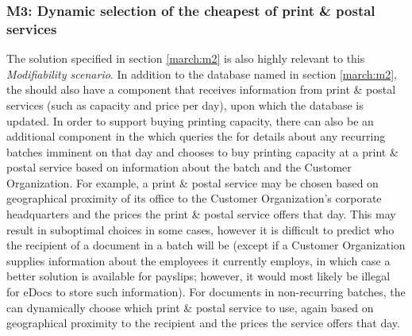 \subsubsection{M3: Dynamic selection of the cheapest of print \& postal services}\label{march:m3}
The solution specified in section \ref{march:m2} is also highly relevant to this \emph{Modifiability scenario}. In addition to the database named in section \ref{march:m2}, the  should also have a component that receives information from print \& postal services (such as capacity and price per day), upon which the database is updated. In order to support buying printing capacity, there can also be an additional component in the  which queries the  for details about any recurring batches imminent on that day and chooses to buy printing capacity at a print \& postal service based on information about the batch and the Customer Organization. For example, a print \& postal service may be chosen based on geographical proximity of its office to the Customer Organization's corporate headquarters and the prices the print \& postal service offers that day. This may result in suboptimal choices in some cases, however it is difficult to predict who the recipient of a document in a batch will be (except if a Customer Organization supplies information about the employees it currently employs, in which case a better solution is available for payslips; however, it would most likely be illegal for eDocs to store such information). For documents in non-recurring batches, the  can dynamically choose which print \& postal service to use, again based on geographical proximity to the recipient and the prices the service offers that day.
